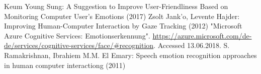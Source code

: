 \documentclass[journal]{IEEEtran}
\begin{document}




\ifCLASSOPTIONcaptionsoff
  \newpage
\fi





%
%
%
\begin{thebibliography}{1}
Keum Young Sung: A Suggestion to Improve User-Friendliness Based
on Monitoring Computer User’s Emotions (2017)
Zsolt Jank'o, Levente Hajder: Improving Human-Computer Interaction
by Gaze Tracking (2012)
"Microsoft Azure Cognitive Services: Emotionserkennung".
\url{https://azure.microsoft.com/de-de/services/cognitive-services/face/#recognition}. Accessed 13.06.2018.
S. Ramakrishnan, Ibrahiem M.M. El Emary: Speech emotion recognition approaches in human computer interactiong (2011)


\end{thebibliography}

% 
\end{document}
